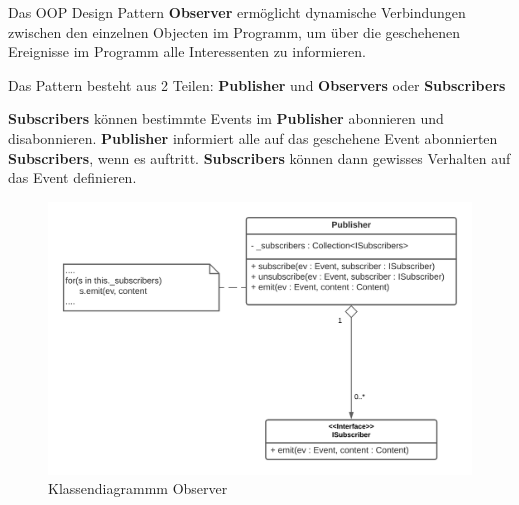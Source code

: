 Das OOP Design Pattern \textbf{Observer} ermöglicht dynamische Verbindungen zwischen den einzelnen 
Objecten im Programm, um über die geschehenen Ereignisse im Programm alle Interessenten 
zu informieren.

Das Pattern besteht aus 2 Teilen: \textbf{Publisher} und \textbf{Observers} oder \textbf{Subscribers}

\textbf{Subscribers} können bestimmte Events im \textbf{Publisher} abonnieren und disabonnieren.
\textbf{Publisher} informiert alle auf das geschehene Event abonnierten \textbf{Subscribers}, wenn es auftritt. 
\textbf{Subscribers} können dann gewisses Verhalten auf das Event definieren.


\begin{figure}[H]
    \centering
    \includegraphics[width=1\textwidth]{Images/Observer.png}
    \caption[UML Observer]{Klassendiagrammm Observer}
    \label{fig:flow around cylinder}
\end{figure}